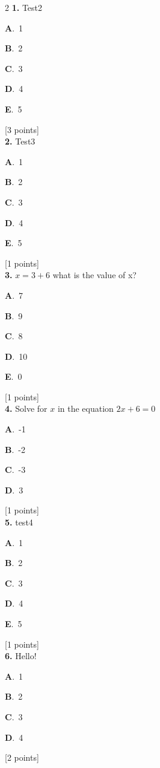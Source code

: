 \documentclass[12pt]{article}
\newcommand{\choice}[3]{%
  \noindent\textbf{#1}.~#2\hfill#3\par\vspace{0.25em}
}
\begin{document}
\begin{multicols}{2}
\noindent \textbf{\textenglish{1.}} {\textenglish{Test2}}

\noindent\choice{A}{{\textenglish{1}}}{}
\noindent\choice{B}{{\textenglish{2}}}{}
\noindent\choice{C}{{\textenglish{3}}}{}
\noindent\choice{D}{{\textenglish{4}}}{}
\noindent\choice{E}{{\textenglish{5}}}{}
\hfill {\textenglish{[3 points]}}\\[0.5em]

\noindent \textbf{\textenglish{2.}} {\textenglish{Test3}}

\noindent\choice{A}{{\textenglish{1}}}{}
\noindent\choice{B}{{\textenglish{2}}}{}
\noindent\choice{C}{{\textenglish{3}}}{}
\noindent\choice{D}{{\textenglish{4}}}{}
\noindent\choice{E}{{\textenglish{5}}}{}
\hfill {\textenglish{[1 points]}}\\[0.5em]

\noindent \textbf{\textenglish{3.}} \(x=3+6 \){\textenglish{ what is the value of x?}}

\noindent\choice{A}{{\textenglish{7}}}{}
\noindent\choice{B}{{\textenglish{9}}}{}
\noindent\choice{C}{{\textenglish{8}}}{}
\noindent\choice{D}{{\textenglish{10}}}{}
\noindent\choice{E}{{\textenglish{0}}}{}
\hfill {\textenglish{[1 points]}}\\[0.5em]

\noindent \textbf{\textenglish{4.}} {\textenglish{Solve for }}\(x \){\textenglish{ in the equation }}\(2x+6 = 0 \)

\noindent\choice{A}{{\textenglish{-1}}}{}
\noindent\choice{B}{{\textenglish{-2}}}{}
\noindent\choice{C}{{\textenglish{-3}}}{}
\noindent\choice{D}{{\textenglish{3}}}{}
\hfill {\textenglish{[1 points]}}\\[0.5em]

\noindent \textbf{\textenglish{5.}} {\textenglish{test4}}

\noindent\choice{A}{{\textenglish{1}}}{}
\noindent\choice{B}{{\textenglish{2}}}{}
\noindent\choice{C}{{\textenglish{3}}}{}
\noindent\choice{D}{{\textenglish{4}}}{}
\noindent\choice{E}{{\textenglish{5}}}{}
\hfill {\textenglish{[1 points]}}\\[0.5em]

\noindent \textbf{\textenglish{6.}} {\textenglish{Hello!}}

\noindent\choice{A}{{\textenglish{1}}}{}
\noindent\choice{B}{{\textenglish{2}}}{}
\noindent\choice{C}{{\textenglish{3}}}{}
\noindent\choice{D}{{\textenglish{4}}}{}
\hfill {\textenglish{[2 points]}}\\[0.5em]


\end{multicols}
\end{document}

